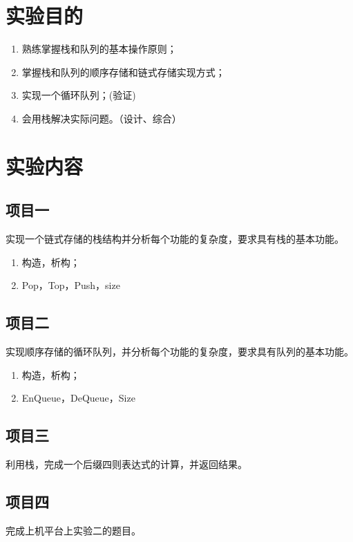 \newpage
\xiaosihao
\section{实验目的}
\begin{enumerate}
\item 熟练掌握栈和队列的基本操作原则；
\item 掌握栈和队列的顺序存储和链式存储实现方式；
\item 实现一个循环队列；(验证)
\item 会用栈解决实际问题。（设计、综合）
\end{enumerate}

\section{实验内容}
\subsection{项目一}
实现一个链式存储的栈结构并分析每个功能的复杂度，要求具有栈的基本功能。
\begin{enumerate}
\item 构造，析构；
\item Pop，Top，Push，size

\end{enumerate}

\subsection{项目二}
实现顺序存储的循环队列，并分析每个功能的复杂度，要求具有队列的基本功能。
\begin{enumerate}
\item 构造，析构；
\item EnQueue，DeQueue，Size
\end{enumerate}

\subsection{项目三}
利用栈，完成一个后缀四则表达式的计算，并返回结果。

\subsection{项目四}
完成上机平台上实验二的题目。


